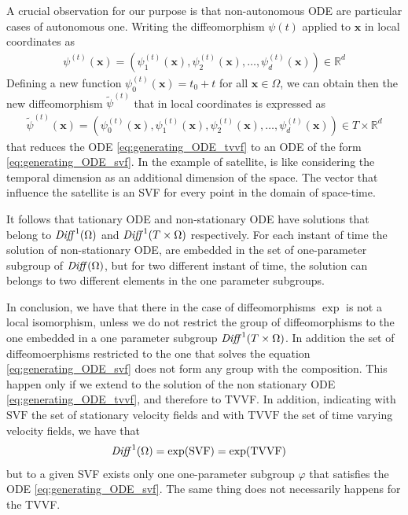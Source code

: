 A crucial observation for our purpose is that non-autonomous ODE are particular cases of autonomous one. Writing the diffeomorphism $\psi(t)$ applied to $\mathbf{x}$ in local coordinates as 
\begin{align*}
\psi^{(t)}(\mathbf{x}) = (\psi_1^{(t)}(\mathbf{x}), \psi_2^{(t)}(\mathbf{x}), \dots ,\psi_d^{(t)}(\mathbf{x})) \in \mathbb{R}^{d}
\end{align*}
Defining a new function $\psi_0^{(t)}(\mathbf{x}) = t_0 + t$ for all $\mathbf{x} \in \Omega$, we can obtain then the new diffeomorphism $\tilde{\psi}^{(t)}$ that in local coordinates is expressed as 
\begin{align*}
\tilde{\psi}^{(t)}(\mathbf{x}) = (\psi_0^{(t)}(\mathbf{x}), \psi_1^{(t)}(\mathbf{x}), \psi_2^{(t)}(\mathbf{x}), \dots ,\psi_d^{(t)}(\mathbf{x})) \in T\times \mathbb{R}^{d}
\end{align*}
that reduces the ODE \ref{eq:generating_ODE_tvvf} to an ODE of the form \ref{eq:generating_ODE_svf}. In the example of satellite, is like considering the temporal dimension as an additional dimension of the space. The vector that influence the satellite is an SVF for every point in the domain of space-time. 

It follows that tationary ODE and non-stationary ODE have solutions that belong to $\text{\emph{Diff}}^{1}(\Omega)$ and $\text{\emph{Diff}}^{1}(T\times \Omega)$ respectively. For each instant of time the solution of non-stationary ODE, are embedded in the set of one-parameter subgroup of $\text{\emph{Diff}}(\Omega)$, but for two different instant of time, the solution can belongs to two different elements in the one parameter subgroups. 

In conclusion, we have that there in the case of diffeomorphisms $\exp$ is not a local isomorphism, unless we do not restrict the group of diffeomorphisms to the one embedded in a one parameter subgroup $\text{\emph{Diff}}^{1}(T\times \Omega)$. In addition the set of diffeomoerphisms restricted to the one that solves the equation \ref{eq:generating_ODE_svf} does not form any group with the composition. This happen only if we extend to the solution of the non stationary ODE \ref{eq:generating_ODE_tvvf}, and therefore to TVVF. In addition, indicating with $\text{SVF}$ the set of stationary velocity fields and with $\text{TVVF}$ the set of time varying velocity fields, we have that
\begin{align*}
\text{\emph{Diff}}^{1}(\Omega) &= \exp(\text{SVF}) = \exp(\text{TVVF})
\end{align*}
but to a given SVF exists only one one-parameter subgroup $\varphi$ that satisfies the ODE \ref{eq:generating_ODE_svf}. The same thing does not necessarily happens for the TVVF.

